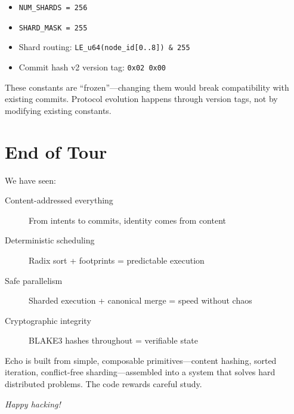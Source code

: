 \begin{itemize}
  \item \texttt{NUM\_SHARDS = 256}
  \item \texttt{SHARD\_MASK = 255}
  \item Shard routing: \texttt{LE\_u64(node\_id[0..8]) \& 255}
  \item Commit hash v2 version tag: \texttt{0x02 0x00}
\end{itemize}

These constants are ``frozen''---changing them would break compatibility with existing
commits. Protocol evolution happens through version tags, not by modifying existing
constants.

\section{End of Tour}

We have seen:

\begin{description}
  \item[Content-addressed everything] From intents to commits, identity comes from content
  \item[Deterministic scheduling] Radix sort + footprints = predictable execution
  \item[Safe parallelism] Sharded execution + canonical merge = speed without chaos
  \item[Cryptographic integrity] BLAKE3 hashes throughout = verifiable state
\end{description}

Echo is built from simple, composable primitives---content hashing, sorted iteration,
conflict-free sharding---assembled into a system that solves hard distributed problems.
The code rewards careful study.

\bigskip
\begin{flushright}
\textit{Happy hacking!}
\end{flushright}
